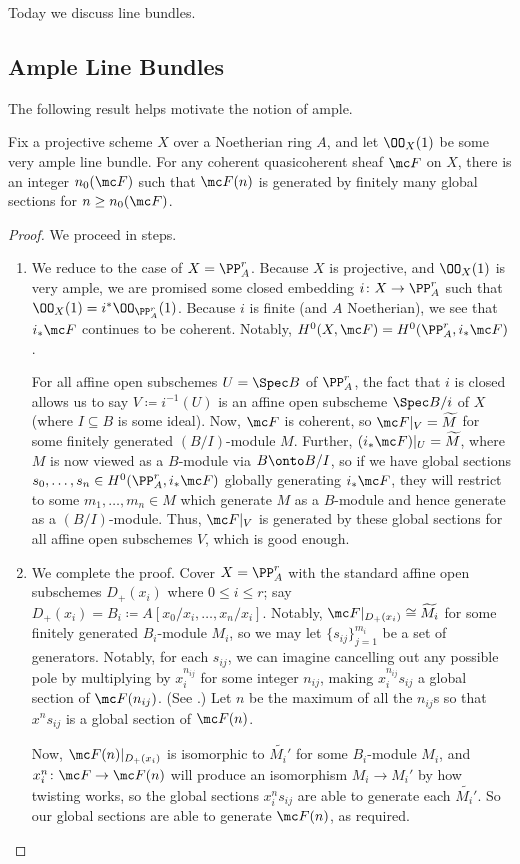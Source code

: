 \documentclass[../notes.tex]{subfiles}
\begin{document}
Today we discuss line bundles.

\subsection{Ample Line Bundles}
The following result helps motivate the notion of ample.
\begin{proposition}[Serre] \label{prop:very-ample-is-ample}
	Fix a projective scheme $X$ over a Noetherian ring $A$, and let $\OO_X(1)$ be some very ample line bundle. For any coherent quasicoherent sheaf $\mc F$ on $X$, there is an integer $n_0(\mc F)$ such that $\mc F(n)$ is generated by finitely many global sections for $n\ge n_0(\mc F)$.
\end{proposition}
\begin{proof}
	We proceed in steps.
	\begin{enumerate}
		\item We reduce to the case of $X=\PP^r_A$. Because $X$ is projective, and $\OO_X(1)$ is very ample, we are promised some closed embedding $i\colon X\to\PP^r_A$ such that $\OO_X(1)=i^*\OO_{\PP^r_A}(1)$. Because $i$ is finite (and $A$ Noetherian), we see that $i_*\mc F$ continues to be coherent. Notably, $H^0(X,\mc F)=H^0(\PP^r_A,i_*\mc F)$.

		For all affine open subschemes $U=\Spec B$ of $\PP^r_A$, the fact that $i$ is closed allows us to say $V\coloneqq i^{-1}(U)$ is an affine open subscheme $\Spec B/i$ of $X$ (where $I\subseteq B$ is some ideal). Now, $\mc F$ is coherent, so $\mc F|_V=\widetilde M$ for some finitely generated $(B/I)$-module $M$. Further, $(i_*\mc F)|_U=\widetilde M$, where $M$ is now viewed as a $B$-module via $B\onto B/I$, so if we have global sections $s_0,\ldots,s_n\in H^0(\PP^r_A,i_*\mc F)$ globally generating $i_*\mc F$, they will restrict to some $m_1,\ldots,m_n\in M$ which generate $M$ as a $B$-module and hence generate as a $(B/I)$-module. Thus, $\mc F|_V$ is generated by these global sections for all affine open subschemes $V$, which is good enough.

		\item We complete the proof. Cover $X=\PP^r_A$ with the standard affine open subschemes $D_+(x_i)$ where $0\le i\le r$; say $D_+(x_i)=B_i\coloneqq A[x_0/x_i,\ldots,x_n/x_i]$. Notably, $\mc F|_{D_+(x_i)}\cong\widetilde{M_i}$ for some finitely generated $B_i$-module $M_i$, so we may let $\{s_{ij}\}_{j=1}^{m_i}$ be a set of generators. Notably, for each $s_{ij}$, we can imagine cancelling out any possible pole by multiplying by $x_i^{n_{ij}}$ for some integer $n_{ij}$, making $x_i^{n_{ij}}s_{ij}$ a global section of $\mc F(n_{ij})$. (See \cite[Lemma~II.5.14]{hartshorne}.) Let $n$ be the maximum of all the $n_{ij}$s so that $x^ns_{ij}$ is a global section of $\mc F(n)$.

		Now, $\mc F(n)|_{D_+(x_i)}$ is isomorphic to $\widetilde{M_i'}$ for some $B_i$-module $M_i$, and $x_i^n\colon\mc F\to\mc F(n)$ will produce an isomorphism $M_i\to M_i'$ by how twisting works, so the global sections $x_i^ns_{ij}$ are able to generate each $\widetilde{M_i'}$. So our global sections are able to generate $\mc F(n)$, as required.
		\qedhere
	\end{enumerate}
\end{proof}
\end{document}
